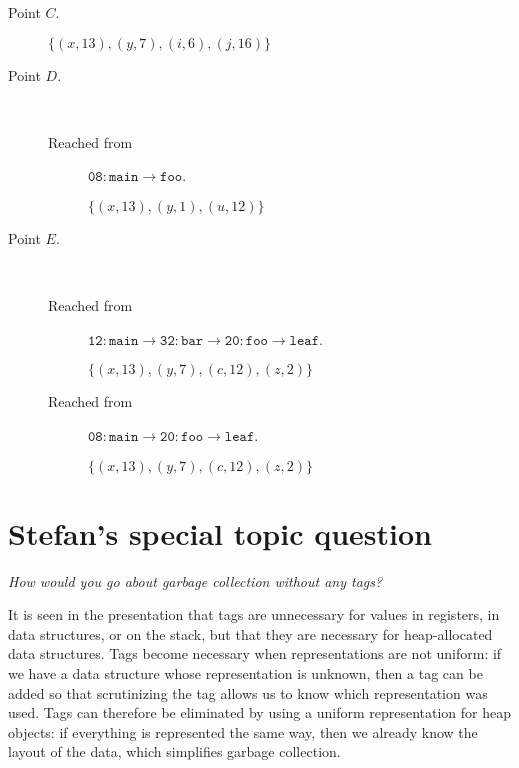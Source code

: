 \documentclass[letterpaper,11pt]{article}
\newcommand{\f}{\mathtt}
\begin{document}
\begin{description}
\begin{description}
      \item[Point $C$.]
        $\{ (x, 13), (y, 7), (i, 6), (j, 16) \}$

      \item[Point $D$.] ~

        \begin{description}
          \item[Reached from] $\f{08:main}\to\f{foo}$.

            $\{ (x, 13), (y, 1), (u, 12) \}$
        \end{description}

      \item[Point $E$.] ~

        \begin{description}
          \item[Reached from]
            $\f{12:main}\to\f{32:bar}\to\f{20:foo}\to\f{leaf}$.

            $\{ (x, 13), (y, 7), (c, 12), (z, 2) \}$

          \item[Reached from]
            $\f{08:main}\to\f{20:foo}\to\f{leaf}$.

            $\{ (x, 13), (y, 7), (c, 12), (z, 2) \}$
        \end{description}

    \end{description}

\end{description}

\section{Stefan's special topic question}

\begin{displayquote}
  \emph{How would you go about garbage collection without any tags?}
\end{displayquote}

It is seen in the presentation that tags are unnecessary for values in
registers, in data structures, or on the stack, but that they are necessary for
heap-allocated data structures. Tags become necessary when representations are
not uniform: if we have a data structure whose representation is unknown, then
a tag can be added so that scrutinizing the tag allows us to know which
representation was used. Tags can therefore be eliminated by using a uniform
representation for heap objects: if everything is represented the same way,
then we already know the layout of the data, which simplifies garbage
collection.
\end{document}
